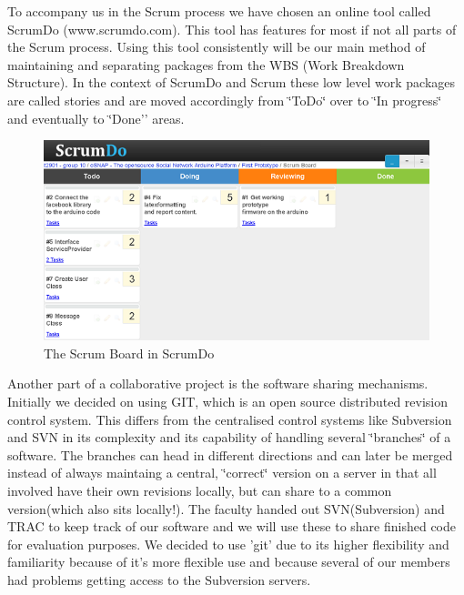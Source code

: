 To accompany us in the Scrum process we have chosen an online tool
called ScrumDo (www.scrumdo.com). This tool has features for most
if not all parts of the Scrum process. Using this tool consistently
will be our main method of maintaining and separating packages from
the WBS (Work Breakdown Structure). In the context of ScrumDo and
Scrum these low level work packages are called stories and are moved
accordingly from \char`\"{}ToDo\char`\"{} over to \char`\"{}In progress\char`\"{}
and eventually to \char`\"{}Done'' areas.

\begin{figure}
\centering \includegraphics{img/management-scrumdo} \caption{The Scrum Board in ScrumDo}


\label{fig:management-scrumdo} 
\end{figure}


Another part of a collaborative project is the software sharing mechanisms.
Initially we decided on using GIT, which is an open source distributed
revision control system. This differs from the centralised control
systems like Subversion and SVN in its complexity and its capability
of handling several \char`\"{}branches\char`\"{} of a software. The
branches can head in different directions and can later be merged
instead of always maintaing a central, \char`\"{}correct\char`\"{}
version on a server in that all involved have their own revisions
locally, but can share to a common version(which also sits locally!).
The faculty handed out SVN(Subversion) and TRAC to keep track of our
software and we will use these to share finished code for evaluation
purposes. We decided to use 'git' due to its higher flexibility and
familiarity because of it's more flexible use and because several
of our members had problems getting access to the Subversion servers. 
